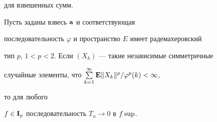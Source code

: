 для взвешенных сумм.





\begin{propnonum} Пусть заданы взвесь ${\bold a}$ и соответствующая


последовательность $\varphi $ и пространство $E$ имеет радемахеровский


тип $p$, $1<p<2$. Если $(X_{k} )$ --- такие независимые симметричные


случайные элементы, что $\sum\limits^{\infty }_{k=1}


{\bold E} \| X_{k} \| ^{p} /\varphi ^{p} (k)<\infty$,


то для любого


$f\in {\bold I}_{p} $ последовательность $T_{n} \to 0$ в $f\sup$.


\end{propnonum}





